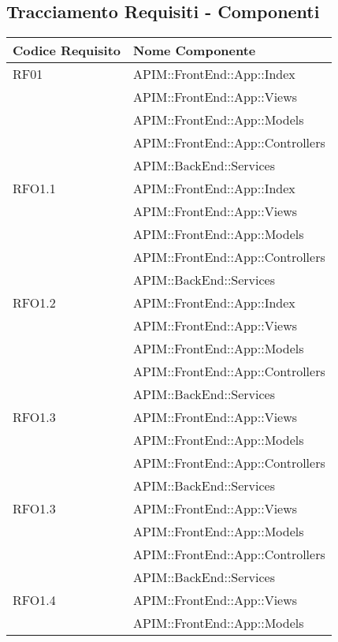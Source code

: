 		\newpage
		\subsection{Tracciamento Requisiti - Componenti}
		\begin{longtable}{ p{4cm} | p{12cm} }
			\hline \rowcolor{Gray}
			\textbf{Codice Requisito} & \textbf{Nome Componente} \\
			\hline
			
			RF01
			& APIM::FrontEnd::App::Index \\
			& APIM::FrontEnd::App::Views \\
			& APIM::FrontEnd::App::Models \\
			& APIM::FrontEnd::App::Controllers \\
			& APIM::BackEnd::Services \\
			\hline
			RFO1.1
			& APIM::FrontEnd::App::Index \\
			& APIM::FrontEnd::App::Views \\
			& APIM::FrontEnd::App::Models \\
			& APIM::FrontEnd::App::Controllers \\
			& APIM::BackEnd::Services \\
			\hline	
			RFO1.2
			& APIM::FrontEnd::App::Index \\
			& APIM::FrontEnd::App::Views \\
			& APIM::FrontEnd::App::Models \\
			& APIM::FrontEnd::App::Controllers \\
			& APIM::BackEnd::Services \\
			\hline
			RFO1.3
			& APIM::FrontEnd::App::Views \\
			& APIM::FrontEnd::App::Models \\
			& APIM::FrontEnd::App::Controllers \\
			& APIM::BackEnd::Services \\
			\hline		
			RFO1.3
			& APIM::FrontEnd::App::Views \\
			& APIM::FrontEnd::App::Models \\
			& APIM::FrontEnd::App::Controllers \\
			& APIM::BackEnd::Services \\
			\hline	
			RFO1.4
			& APIM::FrontEnd::App::Views \\
			& APIM::FrontEnd::App::Models \\

\end{longtable}

